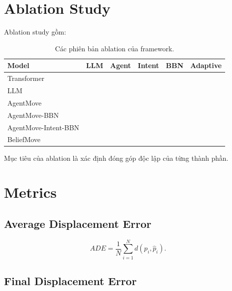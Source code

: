\documentclass[11pt,a4paper]{article}
\begin{document}
	\section{Ablation Study}
	
	Ablation study gồm:
	
	\begin{table}[H]
		\centering
		\caption{Các phiên bản ablation của framework.}
		\label{tab:ablation}
		
		\begin{tabular}{lccccc}
			\toprule
			Model & LLM & Agent & Intent & BBN & Adaptive \\
			\midrule
			Transformer & & & & & \\
			LLM & \checkmark & & & & \\
			AgentMove & \checkmark & \checkmark & \checkmark & & \\
			AgentMove-BBN & \checkmark & \checkmark & & \checkmark & \\
			AgentMove-Intent-BBN & \checkmark & \checkmark & \checkmark & \checkmark & \\
			BeliefMove & \checkmark & \checkmark & \checkmark & \checkmark & \checkmark \\
			\bottomrule
		\end{tabular}
		
	\end{table}
	
	Mục tiêu của ablation là xác định đóng góp độc lập của từng thành phần.
	
	\section{Metrics}
	
	\subsection{Average Displacement Error}
	
	\begin{equation}
		ADE
		=
		\frac{1}{N}
		\sum_{i=1}^{N}
		d(
		p_i,\hat{p}_i
		).
	\end{equation}
	
	\subsection{Final Displacement Error}
	
\end{document}
